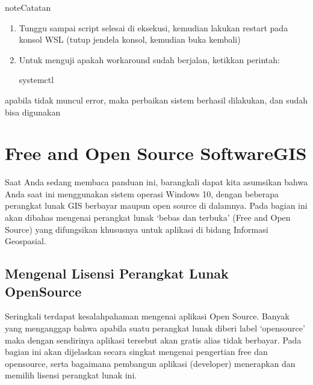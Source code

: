 \documentclass[letterpaper,10pt,english]{sphinxmanual}
\begin{document}
\begin{sphinxadmonition}{note}{Catatan}
\begin{enumerate}
\begin{sphinxVerbatim}[commandchars=\\\{\}]
 ubuntu\PYGZhy{}wsl2\PYGZhy{}systemd\PYGZhy{}script/
bash ubuntu\PYGZhy{}wsl2\PYGZhy{}systemd\PYGZhy{}script.sh
\end{sphinxVerbatim}

\item {} 
Tunggu sampai script selesai di eksekusi, kemudian lakukan restart pada konsol WSL (tutup jendela konsol, kemudian buka kembali)

\item {} 
Untuk menguji apakah workaround sudah berjalan, ketikkan perintah:

\begin{sphinxVerbatim}[commandchars=\\\{\}]
systemctl
\end{sphinxVerbatim}

\end{enumerate}

apabila tidak muncul error, maka perbaikan sistem berhasil dilakukan, dan  sudah bisa digunakan
\end{sphinxadmonition}


\section{Free and Open Source Software\sphinxhyphen{}GIS}
\label{\detokenize{sesi1/fossgis:free-and-open-source-software-gis}}\label{\detokenize{sesi1/fossgis::doc}}
Saat Anda sedang membaca panduan ini, barangkali dapat kita asumsikan bahwa Anda saat ini menggunakan sistem operasi Windows 10, dengan beberapa perangkat lunak GIS berbayar maupun open source di dalamnya. Pada bagian ini akan dibahas mengenai perangkat lunak ‘bebas dan terbuka’ (Free and Open Source) yang difungsikan khususnya untuk aplikasi di bidang Informasi Geospasial.


\subsection{Mengenal Lisensi Perangkat Lunak OpenSource}
\label{\detokenize{sesi1/fossgis:mengenal-lisensi-perangkat-lunak-opensource}}
Seringkali terdapat kesalah\sphinxhyphen{}pahaman mengenai aplikasi Open Source. Banyak yang menganggap bahwa apabila suatu perangkat lunak diberi label ‘opensource’ maka dengan sendirinya aplikasi tersebut akan gratis alias tidak berbayar. Pada bagian ini akan dijelaskan secara singkat mengenai pengertian free dan opensource, serta bagaimana pembangun aplikasi (developer) menerapkan dan memilih lisensi perangkat lunak ini.
\end{document}
